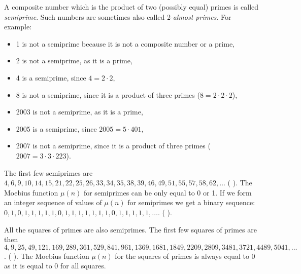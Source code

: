 \documentclass[12pt]{article}
\begin{document}
A composite number which is the product of two (possibly equal) primes is called  \emph{semiprime}. Such numbers are sometimes also called 2-\emph{almost primes}. For example:

\begin{itemize}
\item 1 is not a semiprime because it is not a composite number or a prime, 
\item 2 is not a semiprime, as it is a prime,
\item 4 is a semiprime, since $4 = 2\cdot 2$,
\item 8 is not a semiprime, since it is a product of three primes ($8 = 2\cdot 2\cdot 2$),
\item 2003 is not a semiprime, as it is a prime,
\item 2005 is a semiprime, since $2005 = 5\cdot 401$,
\item 2007 is not a semiprime, since it is a product of three primes ($2007 = 3\cdot 3\cdot 223$).
\end{itemize} 

The first few semiprimes are $4, 6, 9, 10, 14, 15, 21, 22, 25, 26, 33, 34, 35, 38, 39, 46, 49, 51, 55, 57, 58, 62, \ldots$ (
). The Moebius function $\mu(n)$ for semiprimes can be only equal to 0 or 1. If we form an integer sequence of values of $\mu(n)$ for semiprimes we get a binary sequence: $0, 1, 0, 1, 1, 1, 1, 1, 0, 1, 1, 1, 1, 1, 1, 1, 0, 1, 1, 1, 1, 1, \ldots$. (
).

All the squares of primes are also semiprimes. The first few squares of primes are then $4, 9, 25, 49, 121, 169, 289, 361, 529, 841, 961, 1369, 1681, 1849, 2209, 2809, 3481, 3721, 4489, 5041, \ldots$. (
). The Moebius function $\mu(n)$ for the squares of primes is always equal to 0 as it is equal to 0 for all squares.
\end{document}
